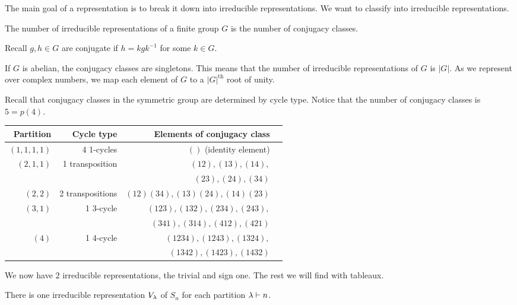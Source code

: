 \documentclass[12pt]{memoir}
\begin{document}
The main goal of a representation is to break it down into irreducible representations. We want to classify into irreducible representations.

\begin{Prop}
    The number of irreducible representations of a finite group $G$ is the number of conjugacy classes.
\end{Prop}

Recall $g,h\in G$ are conjugate if $h=kgk^{-1}$ for some $k\in G$. 

\begin{Ex}
    If $G$ is abelian, the conjugacy classes are singletons. This means that the number of irreducible representations of $G$ is $|G|$. As we represent over complex numbers, we map each element of $G$ to a $|G|^{\text{th}}$ root of unity.
\end{Ex}

\begin{Ex}
    Recall that conjugacy classes in the symmetric group are determined by cycle type. Notice that the number of conjugacy classes is $5=p(4)$. 
    \begin{table*}[h]
        \centering
        \begin{tabular}{rrrr}\toprule
            Partition & Cycle type & Elements of conjugacy class\\ \midrule
            $(1,1,1,1)$& 4 1-cycles & $()$ (identity element)\\
            $(2,1,1)$& 1 transposition & $(12),(13),(14),$\\
            &&$(23),(24),(34)$\\
            $(2,2)$ & 2 transpositions & $(12)(34),(13)(24),(14)(23)$\\
            $(3,1)$ & 1 3-cycle& $(123),(132),(234),(243),$\\
            &&$(341),(314),(412),(421)$\\
            $(4)$ & 1 4-cycle & $(1234),(1243),(1324),$\\
            &&$(1342),(1423),(1432)$\\
       \bottomrule
        \end{tabular}
        \end{table*}
\end{Ex}

We now have $2$ irreducible representations, the trivial and sign one. The rest we will find with tableaux.
\begin{Prop}
    There is one irreducible representation $V_\lambda$ of $S_n$ for each partition $\lambda\vdash n$.
\end{Prop}
\end{document}
